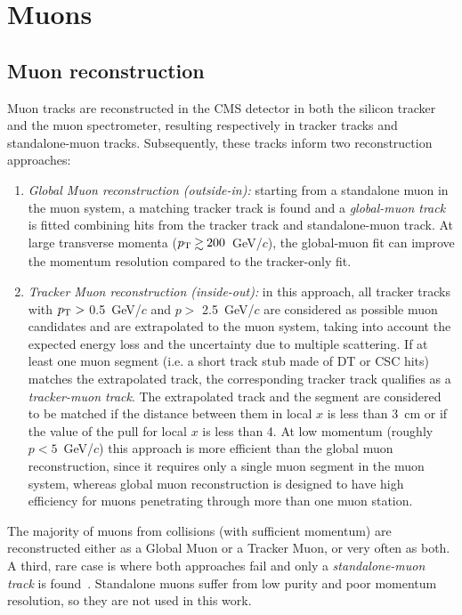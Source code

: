\section{Muons}
\subsection{Muon reconstruction}
Muon tracks are reconstructed in the CMS detector in both the silicon tracker and the muon spectrometer,
resulting respectively in tracker tracks and standalone-muon tracks.
Subsequently, these tracks inform two reconstruction approaches:
\begin{enumerate}
  \item {\em Global Muon reconstruction (outside-in):} starting from a standalone
    muon in the muon system, a matching tracker track is found and a
    {\em global-muon track} is fitted combining hits from the tracker track
    and standalone-muon track. At large transverse momenta ($\pt \gsim 200$~GeV/$c$),
    the global-muon fit can improve the momentum resolution compared
    to the tracker-only fit. 
  \item {\em Tracker Muon reconstruction (inside-out):} in this approach, all
    tracker tracks with $p_{\mathrm{T}} >$ 0.5~GeV/$c$ and $p >$ 2.5~GeV/$c$ are
    considered as possible muon candidates and are extrapolated to the muon system, taking into
    account the expected energy loss and the uncertainty due to multiple
    scattering. If at least one muon segment (i.e. a short track stub made of DT or CSC hits)
    matches the extrapolated track,
    the corresponding tracker track qualifies as a {\em tracker-muon track}.
    The extrapolated track and the segment are considered to be matched if the distance
    between them in local $x$ is less than 3~cm or if the value of the pull
    for local $x$ is less than 4.
    At low momentum (roughly $p < 5$~GeV/$c$) this approach is more
    efficient than the global muon 
    reconstruction, since it requires only a single muon segment in
    the muon system, whereas global muon reconstruction is designed to have
    high efficiency for muons penetrating through more than one muon station.
\end{enumerate}

The majority of muons from collisions (with sufficient momentum) are reconstructed either 
as a Global Muon or a Tracker Muon, or very often as both.
A third, rare case is where both approaches fail and only a {\em standalone-muon track} is found~\cite{CMS-PAS-MUO-10-004}.
Standalone muons suffer from low purity and poor momentum resolution, so they are not used in this work.

